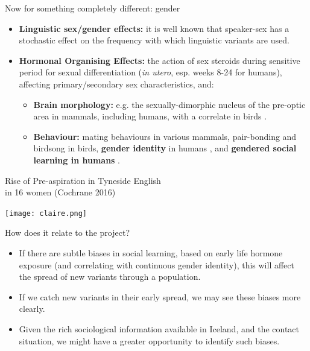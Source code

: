 \documentclass[hyperref={pdfpagelabels=false}]{beamer}
\begin{document}
\begin{frame}{Now for something completely different: gender}
		\begin{itemize}
		\item \textbf{Linguistic sex/gender effects:} it is well known that speaker-sex has a stochastic effect on the frequency with which linguistic variants are used.
		\item \textbf{Hormonal Organising Effects:} the action of sex steroids during sensitive period for sexual differentiation 
		(\textsl{in utero}, esp. weeks 8-24 for humans), affecting primary/secondary sex characteristics, and:
			\begin{itemize}
				\item \textbf{Brain morphology:} e.g. the sexually-dimorphic nucleus of the pre-optic area in mammals, including humans, with a correlate in birds \citep[see review in][]{balthazart2011}.
				\item \textbf{Behaviour:} mating behaviours in various mammals, pair-bonding and birdsong in birds, \textbf{gender identity} in humans \small{\citep{hinesetal2002, berenbaumbailey2003, hinesetal2004, cohenbendahanetal2005, auyeungetal2009}}, and \textbf{gendered social learning in humans} \citep{hinesetal2016}.
			\end{itemize}
	\end{itemize}
\end{frame}

\begin{frame}{Rise of Pre-aspiration in Tyneside English \\ in 16 women \small{(Cochrane 2016)}}


\begin{center}

\texttt{[image: claire.png]}

\end{center}
\end{frame}


\begin{frame}{How does it relate to the project?}
		\begin{itemize}
			\item If there are subtle biases in social learning, based on early life hormone exposure (and correlating with continuous gender identity), this will affect the spread of new variants through a population.
			\item If we catch new variants in their early spread, we may see these biases more clearly.
			\item Given the rich sociological information available in Iceland, and the contact situation, we might have a greater opportunity to identify such biases.
		\end{itemize}
\end{frame}
\end{document}
